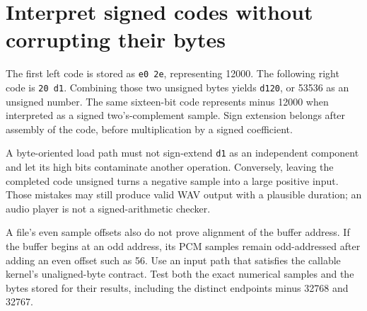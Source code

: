 \section{Interpret signed codes without corrupting their bytes}
The first left code is stored as \texttt{e0 2e}, representing 12000. The following
right code is \texttt{20 d1}. Combining those two unsigned bytes yields
\texttt{d120}, or 53536 as an unsigned number. The same sixteen-bit code represents
minus 12000 when interpreted as a signed two's-complement sample. Sign extension
belongs after assembly of the code, before multiplication by a signed coefficient.

A byte-oriented load path must not sign-extend \texttt{d1} as an independent component
and let its high bits contaminate another operation. Conversely, leaving the completed
code unsigned turns a negative sample into a large positive input. Those mistakes may
still produce valid WAV output with a plausible duration; an audio player is not a
signed-arithmetic checker.

A file's even sample offsets also do not prove alignment of the buffer address. If the
buffer begins at an odd address, its PCM samples remain odd-addressed after adding
an even offset such as 56. Use an input path that satisfies the callable kernel's
unaligned-byte contract. Test both the exact numerical samples and the bytes stored
for their results, including the distinct endpoints minus 32768 and 32767.
